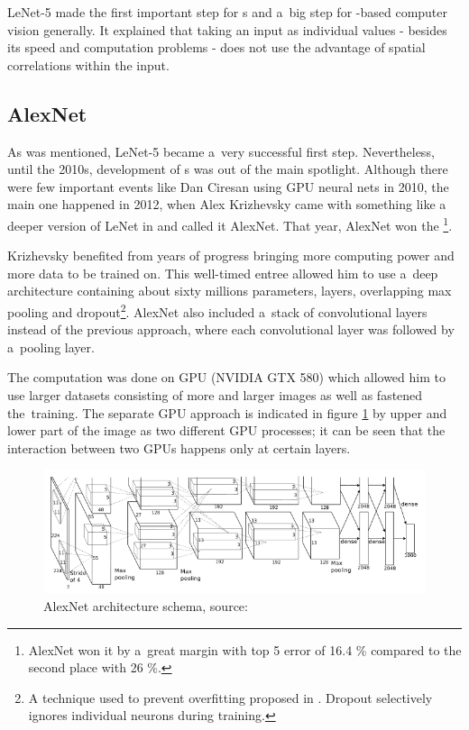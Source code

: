 LeNet-5 made the first important step for s and a~big step for 
-based computer vision generally. It explained that taking an input as 
individual values - besides its speed and computation problems - does not use 
the advantage of spatial correlations within the input. 



\subsection{AlexNet} %
\label{alexnet}

As was mentioned, LeNet-5 became a~very successful first step. Nevertheless, until 
the 2010s, development of s was out of the main spotlight. Although there 
were few important events like Dan Ciresan using GPU neural nets in 2010, the 
main one happened in 2012, when Alex Krizhevsky came with something like a~
deeper version of LeNet in \cite{cnn-classification} and called it AlexNet. That 
year, AlexNet won the \footnote{AlexNet won it by a~great margin with 
top 5 error of 16.4 \% compared to the second place with 26 \%.}.

Krizhevsky benefited from years of progress bringing more computing power and 
more data to be trained on. This well-timed entree allowed him to use a~deep 
architecture containing about sixty millions parameters,  layers, 
overlapping max pooling and dropout\footnote{A technique used to prevent 
overfitting proposed in \cite{dropout}. Dropout selectively ignores individual 
neurons during training.}. AlexNet also included a~stack of convolutional layers 
instead of the previous approach, where each convolutional layer was followed by
a~pooling layer. 

The computation was done on GPU (NVIDIA GTX 580) which allowed him to use larger 
datasets consisting of more and larger images as well as fastened the~training. 
The separate GPU approach is indicated in figure \ref{fig:alexnet} by upper and 
lower part of the image as two different GPU processes; it can be seen that the 
interaction between two GPUs happens only at certain layers. 

\begin{figure}[H]
   \centering
	\includegraphics[width=\linewidth]{./pictures/alexnet.png}
	\caption[AlexNet architecture]{AlexNet architecture schema, source: 
\cite{cnn-classification}}
      \label{fig:alexnet}
\end{figure}

